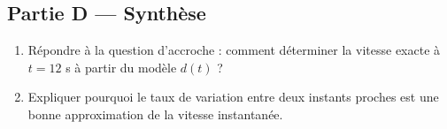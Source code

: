 \subsection*{Partie D — Synthèse}

\begin{enumerate}[resume]
  \item Répondre à la question d'accroche : comment déterminer la vitesse exacte à $t=12$ s à partir du modèle $d(t)$ ?
  \item Expliquer pourquoi le taux de variation entre deux instants proches est une bonne approximation de la vitesse instantanée.
\end{enumerate}
